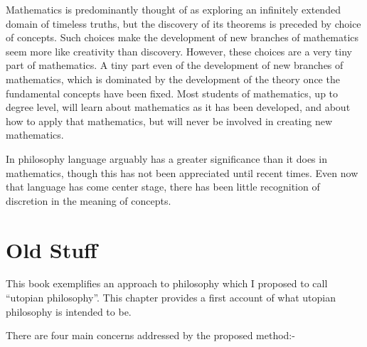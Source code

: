 Mathematics is predominantly thought of as exploring an infinitely extended domain of timeless truths, but the discovery of its theorems is preceded by choice of concepts.
Such choices make the development of new branches of mathematics seem more like creativity than discovery.
However, these choices are a very tiny part of mathematics.
A tiny part even of the development of new branches of mathematics, which is dominated by the development of the theory once the fundamental concepts have been fixed.
Most students of mathematics, up to degree level, will learn about mathematics as it has been developed, and about how to apply that mathematics, but will never be involved in creating new mathematics.

In philosophy language arguably has a greater significance than it does in mathematics, though this has not been appreciated until recent times.
Even now that language has come center stage, there has been little recognition of discretion in the meaning of concepts.

\section{Old Stuff}

This book exemplifies an approach to philosophy which I proposed to call ``utopian philosophy''.
This chapter provides a first account of what utopian philosophy is intended to be.

There are four main concerns addressed by the proposed method:-

